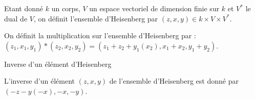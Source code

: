 \begin{definition}
    \label{heisenberg}
    \lean{}
    \leanok

    Etant donné $k$ un corps, $V$ un espace vectoriel de dimension finie sur
    $k$ et $V^*$ le dual de $V$, on définit l'ensemble d'Heisenberg par 
    ${(z,x,y) \in k\times V\times V^*}$.
\end{definition}

\begin{definition}
    \label{mul_H}
    \lean{}
    \leanok 

    On définit la multiplication sur l'ensemble d'Heisenberg par :
    $(z_1,x_1,y_1)*(z_2,x_2,y_2) = (z_1+z_2+y_1(x_2),x_1+x_2,y_1+y_2)$.
\end{definition}

\begin{definition}{Inverse d'un élément d'Heisenberg}
    \label{inv_H}
    \lean{}
    \leanok 

    L'inverse d'un élément $(z,x,y)$ de l'ensemble d'Heisenberg est donné par 
    $(-z- y(-x), - x ,- y)$.
\end{definition}